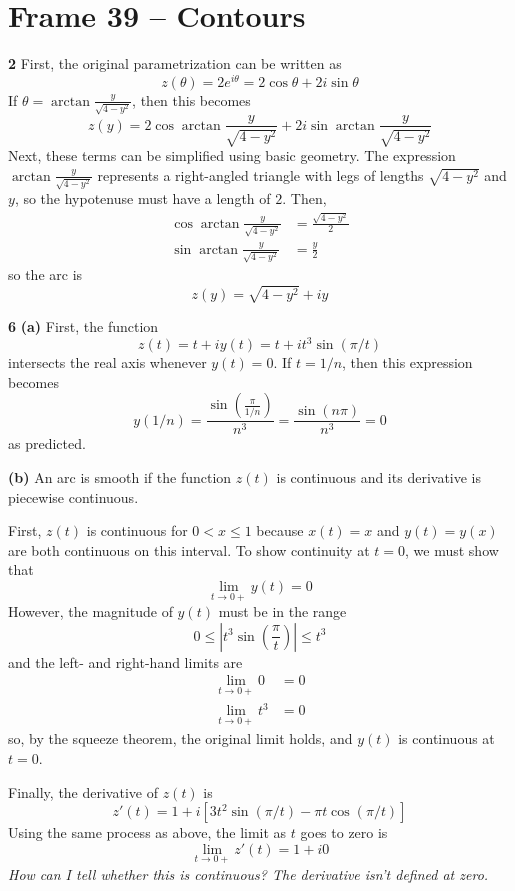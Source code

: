 \documentclass{article}
\begin{document}
\clearpage
\section{Frame 39 -- Contours}
\textbf{2}
First, the original parametrization can be written as
\[
	z(\theta) = 2e^{i\theta} = 2\cos \theta + 2i\sin \theta
\]
If $\theta = \arctan \frac{y}{\sqrt{4 - y^2}}$, then this becomes
\[
	z(y) = 2\cos \arctan \frac{y}{\sqrt{4 - y^2}} 
	+ 2i\sin \arctan \frac{y}{\sqrt{4 - y^2}}
\]
Next, these terms can be simplified using basic geometry. The expression $\arctan \frac{y}{\sqrt{4 - y^2}}$ represents a right-angled triangle with legs of lengths $\sqrt{4 - y^2}$ and $y$, so the hypotenuse must have a length of $2$. Then,
\begin{align*}
	\cos \arctan \frac{y}{\sqrt{4 - y^2}} &= \frac{\sqrt{4 - y^2}}{2} \\
	\sin \arctan \frac{y}{\sqrt{4 - y^2}} &= \frac{y}{2} 
\end{align*}
so the arc is
\[
	z(y) = \sqrt{4 - y^2} + i y
\]

\textbf{6}
\textbf{(a)}
First, the function
\[
	z(t) = t + iy(t)
	= t + it^3 \sin(\pi /t)
\]
intersects the real axis whenever $y(t) = 0$. If $t = 1/n$, then this expression becomes
\[
	y(1/n) = \frac{\sin\left(\frac{\pi}{1 / n} \right)}{n^3}
	= \frac{\sin(n\pi)}{n^3}
	= 0
\]
as predicted.

\textbf{(b)}
An arc is smooth if the function $z(t)$ is continuous and its derivative is piecewise continuous.

First, $z(t)$ is continuous for $0 < x \le 1$ because $x(t) = x$ and $y(t) = y(x)$ are both continuous on this interval. To show continuity at $t = 0$, we must show that
\[
	\lim_{t \to 0+} y(t) = 0
\]
However, the magnitude of $y(t)$ must be in the range
\[
	0 \le \left| t^3 \sin\left( \frac{\pi}{t} \right)\right| \le t^3
\]
and the left- and right-hand limits are
\begin{align*}
	\lim_{t \to 0+} 0 &= 0 \\
	\lim_{t \to 0+} t^3 &= 0
\end{align*}
so, by the squeeze theorem, the original limit holds, and $y(t)$ is continuous at $t = 0$.

Finally, the derivative of $z(t)$ is
\[
	z'(t) = 1 + i\left[3t^2 \sin(\pi / t) - \pi t \cos(\pi / t) \right]	
\]
Using the same process as above, the limit as $t$ goes to zero is
\[
	\lim_{t \to 0+} z'(t) = 1 + i0
\]
\textit{How can I tell whether this is continuous? The derivative isn't defined at zero.}
\end{document}
